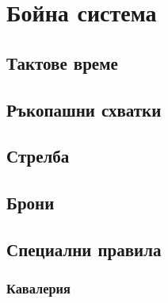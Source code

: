\section{Бойна система}
\subsection{Тактове време}
\subsection{Ръкопашни схватки}
\subsection{Стрелба}
\subsection{Брони}
\subsection{Специални правила}
\subsubsection{Кавалерия}
